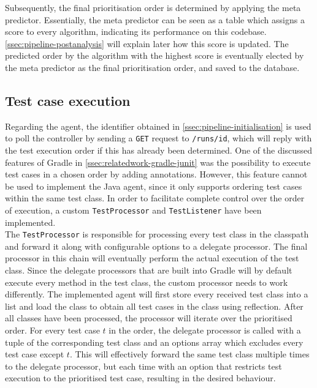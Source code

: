 \noindent Subsequently, the final prioritisation order is determined by applying the meta predictor. Essentially, the meta predictor can be seen as a table which assigns a score to every algorithm, indicating its performance on this codebase. \autoref{ssec:pipeline-postanalysis} will explain later how this score is updated. The predicted order by the algorithm with the highest score is eventually elected by the meta predictor as the final prioritisation order, and saved to the database.

\subsection{Test case execution}
Regarding the agent, the identifier obtained in \autoref{ssec:pipeline-initialisation} is used to poll the controller by sending a \texttt{GET} request to \texttt{/runs/id}, which will reply with the test execution order if this has already been determined. One of the discussed features of Gradle in \autoref{ssec:relatedwork-gradle-junit} was the possibility to execute test cases in a chosen order by adding annotations. However, this feature cannot be used to implement the Java agent, since it only supports ordering test cases within the same test class. In order to facilitate complete control over the order of execution, a custom \texttt{TestProcessor} and \texttt{TestListener} have been implemented.\\

\noindent The \texttt{TestProcessor} is responsible for processing every test class in the classpath and forward it along with configurable options to a delegate processor. The final processor in this chain will eventually perform the actual execution of the test class. Since the delegate processors that are built into Gradle will by default execute every method in the test class, the custom processor needs to work differently. The implemented agent will first store every received test class into a list and load the class to obtain all test cases in the class using reflection. After all classes have been processed, the processor will iterate over the prioritised order. For every test case $t$ in the order, the delegate processor is called with a tuple of the corresponding test class and an options array which excludes every test case except $t$. This will effectively forward the same test class multiple times to the delegate processor, but each time with an option that restricts test execution to the prioritised test case, resulting in the desired behaviour.\\

